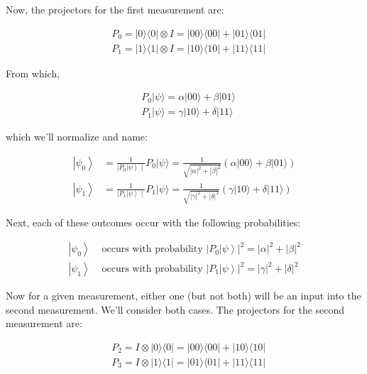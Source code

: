 \documentclass[main.tex]{subfiles}
\begin{document}
    Now, the projectors for the first measurement are:
    
    $$
    \begin{aligned}
    &P_{0}=|0\rangle\langle 0|\otimes I=| 00\rangle\langle 00|+| 01\rangle\langle 01| \\
    &P_{1}=|1\rangle\langle 1|\otimes I=| 10\rangle\langle 10|+| 11\rangle\langle 11|
    \end{aligned}
    $$
    
    From which,
    
    $$
    \begin{aligned}
    &P_{0}|\psi\rangle=\alpha|00\rangle+\beta|01\rangle \\
    &P_{1}|\psi\rangle=\gamma|10\rangle+\delta|11\rangle
    \end{aligned}
    $$
    
    which we'll normalize and name:
    
    $$
    \begin{aligned}
    \left|\psi_{0}\right\rangle &=\frac{1}{\left.\left|P_{0}\right| \psi\right\rangle \mid} P_{0}|\psi\rangle=\frac{1}{\sqrt{|\alpha|^{2}+|\beta|^{2}}}(\alpha|00\rangle+\beta|01\rangle) \\
    \left|\psi_{1}\right\rangle &=\frac{1}{\left.\left|P_{1}\right| \psi\right\rangle \mid} P_{1}|\psi\rangle=\frac{1}{\sqrt{|\gamma|^{2}+|\delta|^{2}}}(\gamma|10\rangle+\delta|11\rangle)
    \end{aligned}
    $$
    
    Next, each of these outcomes occur with the following probabilities:
    
    $$
    \begin{array}{ll}
    \left|\psi_{0}\right\rangle & \text { occurs with probability } \left.\left|P_{0}\right| \psi\right\rangle\left.\right|^{2}=|\alpha|^{2}+|\beta|^{2} \\
    \left|\psi_{1}\right\rangle & \text { occurs with probability } \left.\left|P_{1}\right| \psi\right\rangle\left.\right|^{2}=|\gamma|^{2}+|\delta|^{2}
    \end{array}
    $$
    
    Now for a given measurement, either one (but not both) will be an input into the second measurement. We'll consider both cases. The projectors for the second measurement are:
    
    $$
    \begin{aligned}
    &P_{2}=I \otimes|0\rangle\langle 0|=| 00\rangle\langle 00|+| 10\rangle\langle 10| \\
    &P_{3}=I \otimes|1\rangle\langle 1|=| 01\rangle\langle 01|+| 11\rangle\langle 11|
    \end{aligned}
    $$
    
\end{document}
